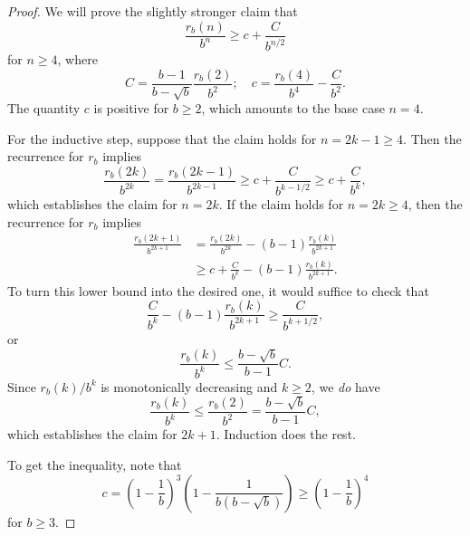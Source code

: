 \documentclass[12pt]{article}
\theoremstyle{definition}
\begin{document}
\begin{proof}
    We will prove the slightly stronger claim that
    \begin{equation*}
        \frac{r_b(n)}{b^n} \geq c + \frac{C}{b^{n / 2}}
    \end{equation*}
    for $n \geq 4$, where
    \begin{equation*}
        C = \frac{b - 1}{b - \sqrt{b}} \frac{r_b(2)}{b^2}
        ; \quad
        c = \frac{r_b(4)}{b^4} - \frac{C}{b^2}.
    \end{equation*}
    The quantity $c$ is positive for $b \geq 2$, which amounts to the base case
    $n = 4$.

    For the inductive step, suppose that the claim holds for $n = 2k - 1 \geq
    4$. Then the recurrence for $r_b$ implies
    \begin{equation*}
        \frac{r_b(2k)}{b^{2k}} = \frac{r_b(2k - 1)}{b^{2k - 1}}
                               \geq c + \frac{C}{b^{k - 1 / 2}}
                               \geq c + \frac{C}{b^k},
    \end{equation*}
    which establishes the claim for $n = 2k$. If the claim holds for $n = 2k
    \geq 4$, then the recurrence for $r_b$ implies
    \begin{align*}
        \frac{r_b(2k + 1)}{b^{2k + 1}} &= \frac{r_b(2k)}{b^{2k}} - (b - 1) \frac{r_b(k)}{b^{2k + 1}} \\
                                       &\geq c + \frac{C}{b^k} - (b - 1)\frac{r_b(k)}{b^{2k + 1}}.
    \end{align*}
    To turn this lower bound into the desired one, it would suffice to check
    that
    \begin{equation*}
        \frac{C}{b^k} - (b - 1)\frac{r_b(k)}{b^{2k + 1}} \geq \frac{C}{b^{k + 1/2}},
    \end{equation*}
    or
    \begin{equation*}
        \frac{r_b(k)}{b^k} \leq \frac{b - \sqrt{b}}{b - 1} C.
    \end{equation*}
    Since $r_b(k) / b^k$ is monotonically decreasing and $k \geq 2$, we
    \emph{do} have
    \begin{equation*}
        \frac{r_b(k)}{b^k} \leq \frac{r_b(2)}{b^2} = \frac{b - \sqrt{b}}{b - 1} C,
    \end{equation*}
    which establishes the claim for $2k + 1$. Induction does the rest.

    To get the inequality, note that
    \begin{equation*}
        c = \left( 1 - \frac{1}{b} \right)^3 \left(1 - \frac{1}{b(b - \sqrt{b})}\right)
        \geq
        \left( 1 - \frac{1}{b} \right)^4
    \end{equation*}
    for $b \geq 3$.
\end{proof}
\end{document}
